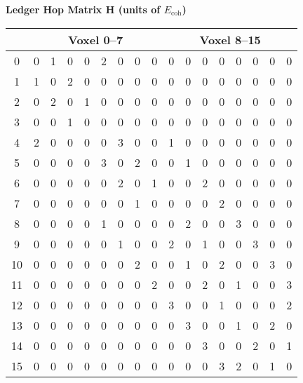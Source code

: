 \documentclass[11pt]{article}
\newcommand{\Eoh}{E_{\mathrm{coh}}}          %
\begin{document}
\begin{center}
\textbf{Ledger Hop Matrix $\mathbf H$ (units of $\Eoh$)}\\[1ex]

\begin{tabular}{c|cccccccc|cccccccc}
\toprule
\multicolumn{1}{c}{} & \multicolumn{8}{c|}{Voxel 0–7} & \multicolumn{8}{c}{Voxel 8–15}\\
\midrule
0  & 0&1&0&0&2&0&0&0 & 0&0&0&0&0&0&0&0\\
1  & 1&0&2&0&0&0&0&0 & 0&0&0&0&0&0&0&0\\
2  & 0&2&0&1&0&0&0&0 & 0&0&0&0&0&0&0&0\\
3  & 0&0&1&0&0&0&0&0 & 0&0&0&0&0&0&0&0\\
4  & 2&0&0&0&0&3&0&0 & 1&0&0&0&0&0&0&0\\
5  & 0&0&0&0&3&0&2&0 & 0&1&0&0&0&0&0&0\\
6  & 0&0&0&0&0&2&0&1 & 0&0&2&0&0&0&0&0\\
7  & 0&0&0&0&0&0&1&0 & 0&0&0&2&0&0&0&0\\
\midrule
8  & 0&0&0&0&1&0&0&0 & 0&2&0&0&3&0&0&0\\
9  & 0&0&0&0&0&1&0&0 & 2&0&1&0&0&3&0&0\\
10 & 0&0&0&0&0&0&2&0 & 0&1&0&2&0&0&3&0\\
11 & 0&0&0&0&0&0&0&2 & 0&0&2&0&1&0&0&3\\
12 & 0&0&0&0&0&0&0&0 & 3&0&0&1&0&0&0&2\\
13 & 0&0&0&0&0&0&0&0 & 0&3&0&0&1&0&2&0\\
14 & 0&0&0&0&0&0&0&0 & 0&0&3&0&0&2&0&1\\
15 & 0&0&0&0&0&0&0&0 & 0&0&0&3&2&0&1&0\\
\bottomrule
\end{tabular}

\vspace{1em}


\end{center}
\end{document}
